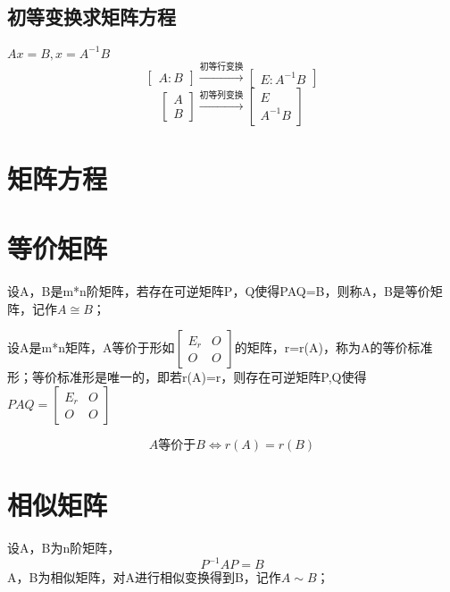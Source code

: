 \subsection{初等变换求矩阵方程}
\(Ax = B, x = A^{-1}B\)
\[
\begin{bmatrix}
A:B
\end{bmatrix}
\xrightarrow{\text{初等行变换}}
\begin{bmatrix}
E:A^{-1}B
\end{bmatrix}
\]
\[
\begin{bmatrix}
A \\ 
B
\end{bmatrix}
\xrightarrow{\text{初等列变换}}
\begin{bmatrix}
E \\ 
A^{-1}B
\end{bmatrix}
\]



\section{矩阵方程}


\section{等价矩阵}

设A，B是m*n阶矩阵，若存在可逆矩阵P，Q使得PAQ=B，则称A，B是等价矩阵，记作\(A \cong B\)；

设A是m*n矩阵，A等价于形如\(
\begin{bmatrix}
E_r & O \\ 
O & O
\end{bmatrix}
\)的矩阵，r=r(A)，称为A的等价标准形；等价标准形是唯一的，即若r(A)=r，则存在可逆矩阵P,Q使得\(PAQ = 
\begin{bmatrix}
E_r & O \\ 
O & O
\end{bmatrix}\)

\[A \text{等价于} B \Leftrightarrow r(A) = r(B)\]
\mymatrix


\section{相似矩阵}

设A，B为n阶矩阵，
\[P^{-1}AP = B\]
A，B为相似矩阵，对A进行相似变换得到B，记作\(A \sim B\)；

